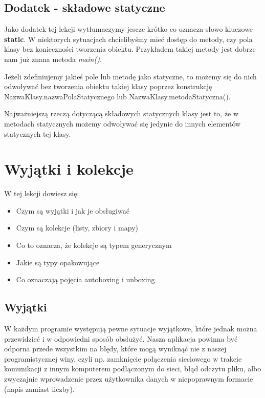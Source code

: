 \documentclass[letterpaper,10pt,english]{sphinxmanual}
\begin{document}
\subsection{Dodatek - składowe statyczne}
\label{obiekty2:dodatek-skladowe-statyczne}
Jako dodatek tej lekcji wytłumaczymy jescze krótko co oznacza słowo kluczowe \textbf{static}. W niektorych sytuacjach chcielibyśmy mieć dostęp do metody, czy pola klasy bez konieczności tworzenia obiektu. Przykładem takiej metody jest dobrze nam już znana metoda \emph{main()}.

Jeżeli zdefiniujemy jakieś pole lub metodę jako statyczne, to możemy się do nich odwoływać bez tworzenia obiektu takiej klasy poprzez konstrukcję NazwaKlasy.nazwaPolaStatycznego lub NazwaKlasy.metodaStatyczna().

Najważniejszą rzeczą dotyczącą składowych statycznych klasy jest to, że w metodach statycznych możemy odwoływać się jedynie do innych elementów statycznych tej klasy.


\section{Wyjątki i kolekcje}
\label{wyjkol:wyjatki-i-kolekcje}\label{wyjkol::doc}
W tej lekcji dowiesz się:
\begin{itemize}
\item {} 
Czym są wyjątki i jak je obsługiwać

\item {} 
Czym są kolekcje (listy, zbiory i mapy)

\item {} 
Co to oznacza, że kolekcje są typem generycznym

\item {} 
Jakie są typy opakowujące

\item {} 
Co oznaczają pojęcia autoboxing i unboxing

\end{itemize}


\subsection{Wyjątki}
\label{wyjkol:wyjatki}
W każdym programie występują pewne sytuacje wyjątkowe, które jednak można przewidzieć i w odpowiedni sposób obsłużyć. Nasza aplikacja powinna być odporna przede wszystkim na błędy, które mogą wyniknąć nie z naszej programistycznej winy, czyli np. zamknięcie połączenia sieciowego w trakcie komunikacji z innym komputerem podłączonym do sieci, błąd odczytu pliku, albo zwyczajnie wprowadzenie przez użytkownika danych w niepoprawnym formacie (napis zamiast liczby).
\end{document}
